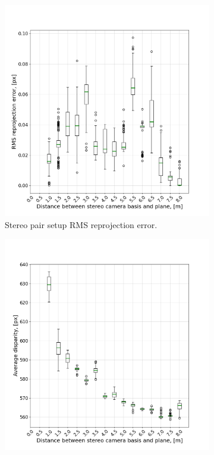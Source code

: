 \begin{figure}[ht]
  \begin{subfigure}[t]{0.48\textwidth}
        \centering
        \includegraphics[width=\textwidth]{graphics/experiment_1_repro_error.png}
        \caption[Stereo pair setup RMS reprojection error.]{Stereo pair setup RMS reprojection error.}
        \label{fig:exp_1_repro}
    \end{subfigure}
    \begin{subfigure}[t]{0.48\textwidth}
        \centering
        \includegraphics[width=\textwidth]{graphics/disparity_mean.png}

\end{subfigure}
\end{figure}
